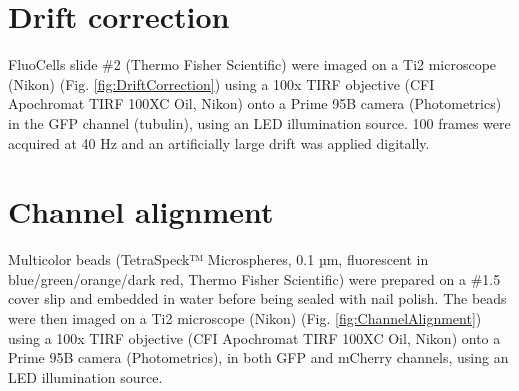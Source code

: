 

\onecolumn %
\fancyhead{} %
\renewcommand{\floatpagefraction}{0.1}
\lfoot[\bSupInf]{\dAuthor}
\rfoot[\dAuthor]{\cSupInf}
\newpage

\captionsetup*{format=largeformat} %
\setcounter{figure}{0} %
\setcounter{equation}{0} %
\setcounter{table}{0} %
\setcounter{page}{1} %
\makeatletter
\renewcommand{\thefigure}{S\@arabic\c@figure} %
\makeatother
\makeatletter
\renewcommand{\thetable}{S\@arabic\c@table} %
\makeatother
\makeatletter
\renewcommand{\theequation}{S\@arabic\c@equation} %
\makeatother





\newpage
\section{Drift correction}
FluoCells slide \#2 (Thermo Fisher Scientific) were imaged on a Ti2 microscope (Nikon) (Fig. \ref{fig:DriftCorrection}) using a 100x TIRF objective (CFI Apochromat TIRF 100XC Oil, Nikon) onto a Prime 95B camera (Photometrics) in the GFP channel (tubulin), using an LED illumination source. 100 frames were acquired at 40 Hz and an artificially large drift was applied digitally.


\section{Channel alignment}

Multicolor beads (TetraSpeck™ Microspheres, 0.1 µm, fluorescent in blue/green/orange/dark red, Thermo Fisher Scientific) were prepared on a \#1.5 cover slip and embedded in water before being sealed with nail polish. The beads were then imaged on a Ti2 microscope (Nikon) (Fig. \ref{fig:ChannelAlignment}) using a 100x TIRF objective (CFI Apochromat TIRF 100XC Oil, Nikon) onto a Prime 95B camera (Photometrics), in both GFP and mCherry channels, using an LED illumination source. 

